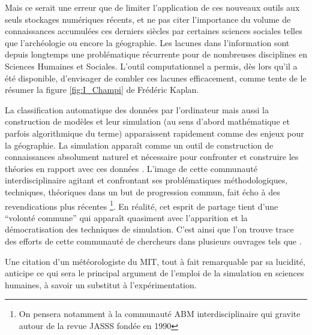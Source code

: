 Mais ce serait une erreur que de limiter l'application de ces nouveaux outils aux seuls stockages numériques récents, et ne pas citer l'importance du volume de connaissances accumulées ces derniers siècles par certaines sciences sociales telles que l'archéologie ou encore la géographie. Les lacunes dans l'information sont depuis longtemps une problématique récurrente pour de nombreuses disciplines en Sciences Humaines et Sociales. L'outil computationnel a permis, dès lors qu'il a été disponible, d'envisager de combler ces lacunes efficacement, comme tente de le résumer la figure \ref{fig:I_Champi} de Frédéric Kaplan. 


La classification automatique des données par l'ordinateur mais aussi la construction de modèles et leur simulation (au sens d'abord mathématique et parfois algorithmique du terme) apparaissent rapidement comme des enjeux pour la géographie. La simulation apparaît comme un outil de construction de connaissances absolument naturel et nécessaire pour confronter et construire les théories en rapport avec ces données \autocites{Kao1963, Hagerstrand1967b}. L'image de cette communauté interdisciplinaire agitant et confrontant ses problématiques méthodologiques, techniques, théoriques dans un but de progression commun, fait écho à des revendications plus récentes \footnote{On pensera notamment à la communauté ABM interdisciplinaire qui gravite autour de la revue JASSS fondée en  1990}. En réalité, cet esprit de partage tient d'une \enquote{volonté commune} qui apparaît quasiment avec l'apparition et la démocratisation des techniques de simulation. C'est ainsi que l'on trouve trace des efforts de cette communauté de chercheurs dans plusieurs ouvrages tels que \autocites{Borko1962,Beshers1965,Naylor1966,Dutton1971,Guetzkow1962,Guetzkow1972}.

Une citation d'un météorologiste du MIT, tout à fait remarquable par sa lucidité, anticipe ce qui sera le principal argument de l'emploi de la simulation en sciences humaines, à savoir un substitut à l'expérimentation.

